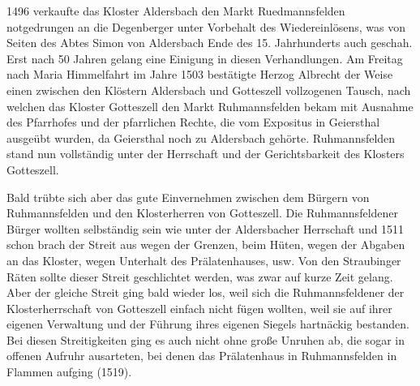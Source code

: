 \documentclass[12pt,a4pager]{book}
\begin{document}
1496 verkaufte das Kloster Aldersbach den Markt Ruedmannsfelden notgedrungen an
die Degenberger unter Vorbehalt des Wiedereinlösens, was von Seiten des Abtes
Simon von Aldersbach Ende des 15. Jahrhunderts auch geschah. Erst nach 50 Jahren
gelang eine Einigung in diesen Verhandlungen. Am Freitag nach Maria Himmelfahrt
im Jahre 1503 bestätigte Herzog Albrecht der Weise einen zwischen den Klöstern
Aldersbach und Gotteszell vollzogenen Tausch, nach welchen das Kloster
Gotteszell den Markt Ruhmannsfelden bekam mit Ausnahme des Pfarrhofes und der
pfarrlichen Rechte, die vom Expositus in Geiersthal ausgeübt wurden, da
Geiersthal noch zu Aldersbach gehörte. Ruhmannsfelden stand nun vollständig
unter der Herrschaft und der Gerichtsbarkeit des Klosters Gotteszell.

Bald trübte sich aber das gute Einvernehmen zwischen dem Bürgern von
Ruhmannsfelden und den Klosterherren von Gotteszell. Die Ruhmannsfeldener Bürger
wollten selbständig sein wie unter der Aldersbacher Herrschaft und 1511 schon
brach der Streit aus wegen der Grenzen, beim Hüten, wegen der Abgaben an das
Kloster, wegen Unterhalt des Prälatenhauses, usw. Von den Straubinger Räten
sollte dieser Streit geschlichtet werden, was zwar auf kurze Zeit gelang. Aber
der gleiche Streit ging bald wieder los, weil sich die Ruhmannsfeldener der
Klosterherrschaft von Gotteszell einfach nicht fügen wollten, weil sie auf ihrer
eigenen Verwaltung und der Führung ihres eigenen Siegels hartnäckig bestanden.
Bei diesen Streitigkeiten ging es auch nicht ohne große Unruhen ab, die sogar in
offenen Aufruhr ausarteten, bei denen das Prälatenhaus in Ruhmannsfelden in
Flammen aufging (1519).
\end{document}
